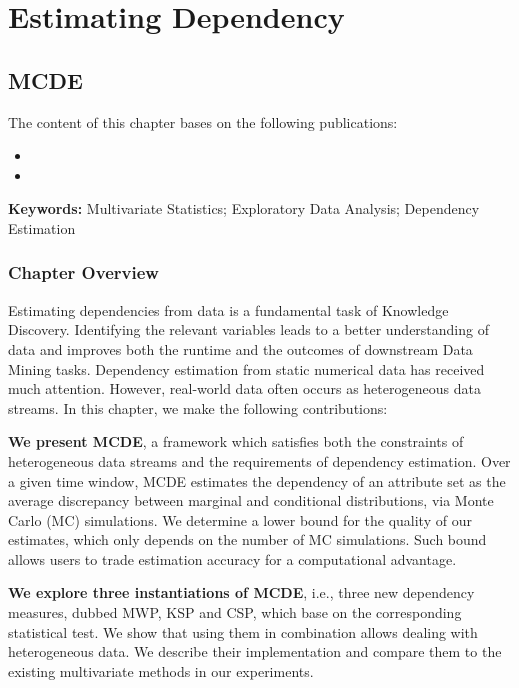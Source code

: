 \part{Estimating Dependency}
\label{partII}

\chapter{\acrlong{MCDE}}
\glsresetall
\label{chapter:MCDE}

The content of this chapter bases on the following publications: 

\begin{itemize}[noitemsep]
	\item {}
	\item {}
\end{itemize}
\textbf{Keywords:} Multivariate Statistics; Exploratory Data Analysis; Dependency Estimation %

\section{Chapter Overview} 

Estimating dependencies from data is a fundamental task of Knowledge Discovery. Identifying the relevant variables leads to a better understanding of data and improves both the runtime and the outcomes of downstream Data Mining tasks. 
Dependency estimation from static numerical data has received much attention.
However, real-world data often occurs as heterogeneous data streams. In this chapter, we make the following contributions:

\textbf{We present \gls{MCDE}}, a framework which satisfies both the constraints of heterogeneous data streams and the requirements of dependency estimation. Over a given time window, \gls{MCDE} estimates the dependency of an attribute set as the average discrepancy between marginal and conditional distributions, via Monte Carlo (MC) simulations. %
We determine a lower bound for the quality of our estimates, which only depends on the number of MC simulations. Such bound allows users to trade estimation accuracy for a computational advantage. 

\textbf{We explore three instantiations of \gls{MCDE}}, i.e., three new dependency measures, dubbed \gls{MWP}, \gls{KSP} and \gls{CSP}, which base on the corresponding statistical test. We show that using them in combination allows dealing with heterogeneous data. 
We describe their implementation and compare them to the existing multivariate methods in our experiments. 

